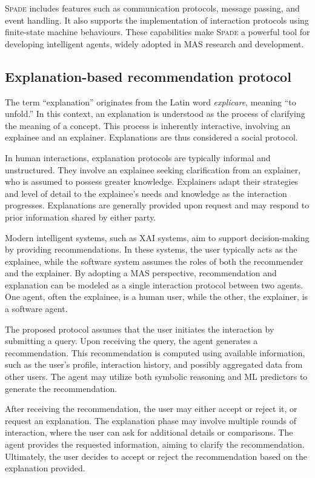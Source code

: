 \textsc{Spade} includes features such as communication protocols, message passing, and event handling.
%
It also supports the implementation of interaction protocols using finite-state machine behaviours.
%
These capabilities make \textsc{Spade} a powerful tool for developing intelligent agents, widely adopted in \gls{MAS} research and development.


\subsection{Explanation-based recommendation protocol}
\label{subsec:explanation-based-recommendation-protocol}
%
The term ``explanation'' originates from the Latin word \emph{explicare}, meaning ``to unfold.''
%
In this context, an explanation is understood as the process of clarifying the meaning of a concept.
%
This process is inherently interactive, involving an explainee and an explainer.
%
Explanations are thus considered a social protocol.

In human interactions, explanation protocols are typically informal and unstructured.
%
They involve an explainee seeking clarification from an explainer, who is assumed to possess greater knowledge.
%
Explainers adapt their strategies and level of detail to the explainee's needs and knowledge as the interaction progresses.
%
Explanations are generally provided upon request and may respond to prior information shared by either party.

Modern intelligent systems, such as \gls{XAI} systems, aim to support decision-making by providing recommendations.
%
In these systems, the user typically acts as the explainee, while the software system assumes the roles of both the recommender and the explainer.
%
By adopting a \gls{MAS} perspective, recommendation and explanation can be modeled as a single interaction protocol between two agents.
%
One agent, often the explainee, is a human user, while the other, the explainer, is a software agent.

The proposed protocol assumes that the user initiates the interaction by submitting a query.
%
Upon receiving the query, the agent generates a recommendation.
%
This recommendation is computed using available information, such as the user's profile, interaction history, and possibly aggregated data from other users.
%
The agent may utilize both symbolic reasoning and \gls{ML} predictors to generate the recommendation.

%
After receiving the recommendation, the user may either accept or reject it, or request an explanation.
%
The explanation phase may involve multiple rounds of interaction, where the user can ask for additional details or comparisons.
%
The agent provides the requested information, aiming to clarify the recommendation.
%
Ultimately, the user decides to accept or reject the recommendation based on the explanation provided.

